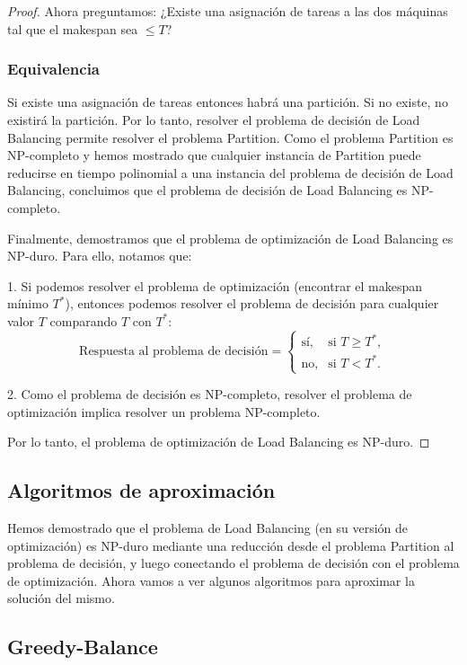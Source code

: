 \documentclass{report}
\begin{document}
\begin{proof}
	Ahora preguntamos: ¿Existe una asignación de tareas a las dos máquinas tal que el makespan sea $ \leq T $?
	
	\subsubsection*{Equivalencia}
	Si existe una asignación de tareas entonces habrá una partición. Si no existe, no existirá la partición. Por lo tanto, resolver el problema de decisión de Load Balancing permite resolver el problema Partition.
	Como el problema Partition es NP-completo y hemos mostrado que cualquier instancia de Partition puede reducirse en tiempo polinomial a una instancia del problema de decisión de Load Balancing, concluimos que el problema de decisión de Load Balancing es NP-completo.
	
	
	Finalmente, demostramos que el problema de optimización de Load Balancing es NP-duro. Para ello, notamos que:
	
	1. Si podemos resolver el problema de optimización (encontrar el makespan mínimo $ T^* $), entonces podemos resolver el problema de decisión para cualquier valor $ T $ comparando $ T $ con $ T^* $:
	\[
	\text{Respuesta al problema de decisión} =
	\begin{cases}
		\text{sí}, & \text{si } T \geq T^*, \\
		\text{no}, & \text{si } T < T^*.
	\end{cases}
	\]
	
	2. Como el problema de decisión es NP-completo, resolver el problema de optimización implica resolver un problema NP-completo.
	
	Por lo tanto, el problema de optimización de Load Balancing es NP-duro.
		\end{proof}
	
	\subsection{Algoritmos de aproximación}

	Hemos demostrado que el problema de Load Balancing (en su versión de optimización) es NP-duro mediante una reducción desde el problema Partition al problema de decisión, y luego conectando el problema de decisión con el problema de optimización. Ahora vamos a ver algunos algoritmos para aproximar la solución del mismo.
	



	
	\subsection*{Greedy-Balance}
	
\end{document}
